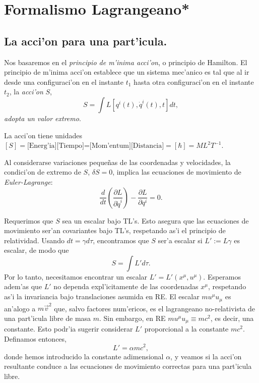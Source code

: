 \section{Formalismo Lagrangeano*}
\subsection{La acci'on para una part'icula.}
Nos basaremos en el \emph{principio de m'inima acci'on}, o
principio de Hamilton. El principio de m'inima acci'on
establece que un sistema mec'anico es tal que al ir desde una
configuraci'on en el instante $t_1$ hasta otra configuraci'on en el instante
$t_2$, la \textit{acci'on} $S$,
\begin{equation}
S=\int L\left[  q^i(t),\dot{q}^i(t)  ,t\right]  dt, \label{Sdt}
\end{equation}
\textit{adopta un valor extremo}.

La acci'on tiene unidades $\left[  S\right]  = \text{[Energ'ia][Tiempo]=[Mom'entum][Distancia]}=[\hbar]=ML^2T^{-1}$.

Al considerarse variaciones peque\~nas de las coordenadas y
velocidades, la condici'on de extremo de $S$, $\delta S=0$, implica las
ecuaciones de movimiento de \textit{Euler-Lagrange}:
\begin{equation}
\frac{d}{dt}\left(  \frac{\partial L}{\partial\dot{q}^i}\right)
-\frac{\partial L}{\partial q^i}=0.\label{L-euler}%
\end{equation}

Requerimos que $S$ sea un escalar bajo TL's. Esto asegura que las ecuaciones de
movimiento ser'an covariantes bajo TL's, respetando as'i el principio de
relatividad. Usando $dt=\gamma d\tau$, encontramos que $S$ ser'a escalar si
$L':=L\gamma$ es escalar, de modo que
\begin{equation}
S=\int L' d\tau.
\end{equation}
Por lo tanto, necesitamos encontrar un escalar $L'=L'(x^\mu,u^\mu)$. Esperamos
adem'as que $L'$ no dependa expl'icitamente de las coordenadas $x^\mu$,
respetando as'i la invariancia bajo translaciones asumida en RE. El escalar $m u^\mu u_\mu$  es an'alogo a $m\vec{v}^2$  que, salvo factores
num'ericos, es el lagrangeano no-relativista de una part'icula libre de masa $m$. Sin embargo, en RE $m u^\mu u_\mu\equiv mc^2$, es decir, una constante. Esto podr'ia sugerir considerar $L'$ proporcional a la constante $mc^2$. Definamos entonces,
\begin{equation}
L'=\alpha mc^2,
\end{equation}
donde hemos introducido la constante adimensional $\alpha$, y veamos si la acci'on resultante conduce a las ecuaciones de movimiento correctas para una part'icula libre.

